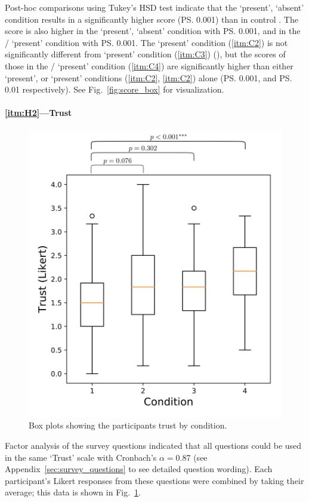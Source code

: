 Post-hoc comparisons using Tukey's HSD test indicate that the \xQ{} `present', \xO{} `absent' condition  results in a significantly higher score (\ps{0.001}) than in control . The score is also higher  in the \xO{} `present', \xQ{} `absent' condition  with \ps{0.001}, and in the \xQ/\xO{} `present' condition  with \ps{0.001}. The \xQ{} `present' condition (\ref{itm:C2}) is not significantly different from \xO{} `present' condition (\ref{itm:C3}) (\pns), but the scores of those in the \xQ/\xO{} `present' condition (\ref{itm:C4}) are significantly higher than either \xQ{} `present', or \xO{} `present' conditions (\ref{itm:C2}, \ref{itm:C2}) alone (\ps{0.001}, and \ps{0.01} respectively). See Fig.~\ref{fig:score_box} for visualization.

\paragraph{\ref{itm:H2}---Trust}
       \begin{figure}[tb]
            \centering
            \includegraphics[width=0.8\linewidth]{Figures/trust_box.png}
            \caption{Box plots showing the participants trust by condition.}
            \label{fig:trust_box}
       \end{figure}
Factor analysis of the survey questions indicated that all questions could be used in the same `Trust' scale with Cronbach's $\alpha = 0.87$ (see Appendix~\ref{sec:survey_questions} to see detailed question wording). Each participant's Likert responses from these questions were combined by taking their average; this data is shown in Fig.~\ref{fig:trust_box}.

